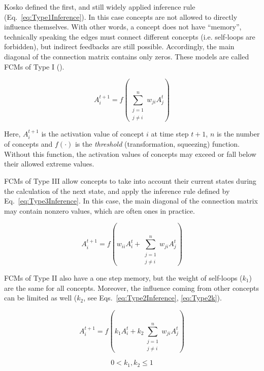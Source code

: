 \documentclass[graybox]{svmult}
\begin{document}
Kosko defined the first, and still widely applied inference rule (Eq.~\ref{eq:Type1Inference}). In this case concepts are not allowed to directly influence themselves. With other words, a concept does not have ``memory'', technically speaking the edges must connect different concepts (i.e. self-loops are forbidden), but indirect feedbacks are still possible. Accordingly, the main diagonal of the connection matrix contains only zeros. These models are called FCMs of Type I (\cite{stylios1999mathematical}).

\begin{equation}
\label{eq:Type1Inference}
A_{i}^{t+1} = f \left( \sum_{\substack{j=1\\j \ne i}}^{n} w_{ji}A_{j}^{t} \right)
\end{equation}

Here, $A_i^{t+1}$ is the activation value of concept $i$ at time step $t+1$, $n$ is the number of concepts and $f(\cdot)$ is the \emph{threshold} (transformation, squeezing) function. Without this function, the activation values of concepts may exceed or fall below their allowed extreme values.

FCMs of Type III allow concepts to take into account their current states during the calculation of the next state, and apply the inference rule defined by Eq.~\ref{eq:Type3Inference}. In this case, the main diagonal of the connection matrix may contain nonzero values, which are often ones in practice.

\begin{equation}
\label{eq:Type3Inference}
A_{i}^{t+1} = f \left( w_{ii}A_i^t + \sum_{\substack{j=1\\j \ne i}}^{n} w_{ji}A_{j}^{t} \right)
\end{equation}

FCMs of Type II also have a one step memory, but the weight of self-loops ($k_1$) are the same for all concepts. Moreover, the influence coming from other concepts can be limited as well ($k_2$, see Eqs.~\ref{eq:Type2Inference}, \ref{eq:Type2k}). 

\begin{equation}
\label{eq:Type2Inference}
A_{i}^{t+1} = f \left( k_1 A_i^t + k_2 \sum_{\substack{j=1\\j \ne i}}^{n} w_{ji}A_{j}^{t} \right)
\end{equation}

\begin{equation}
\label{eq:Type2k}
0 < k_1, k_2 \leq 1
\end{equation}
\end{document}
